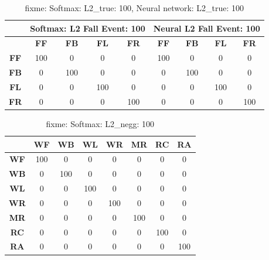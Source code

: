 \documentclass{IEEEtran}
\begin{document}
\begin{table}
\caption{fixme: Softmax: L2\_true: 100, Neural network: L2\_true: 100}
\resizebox{\columnwidth}{!}
{
\begin{tabular}{|c|c|c|c|c||c|c|c|c|}
\hline 
& \multicolumn{4}{c||}{\bf Softmax: L2 Fall Event: 100} & \multicolumn{4}{c|}{\bf Neural 
L2 Fall Event: 100} \\ \hline
& \textbf{FF} & \textbf{FB}  & \textbf{FL} & \textbf{FR} & \textbf{FF} & \textbf{FB}  & 
\textbf{FL} & \textbf{FR} \\ \hline
\textbf{FF} & 100 &  0 &  0 &  0  & 100 &  0 &  0 &  0\\ \hline
\textbf{FB} & 0 &  100 &  0 &  0  & 0 &  100 &  0 &  0\\ \hline
\textbf{FL} & 0 &  0 &  100 &  0  & 0 &  0 &  100 &  0\\ \hline
\textbf{FR} & 0 &  0 &  0 &  100  & 0 &  0 &  0 &  100 \\ \hline
\end{tabular}
}
\end{table}

\begin{table}
\caption{fixme: Softmax: L2\_negg: 100}
\resizebox{\columnwidth}{!}
{
\begin{tabular}{|c|c|c|c|c|c|c|c|}
\hline 
 & \textbf{WF} & \textbf{WB} & \textbf{WL} & \textbf{WR} & \textbf{MR} & 
\textbf{RC} & \textbf{RA} \\ \hline    
\textbf{WF} & 100 &  0 &  0 &  0 &  0 &  0 &  0 \\ \hline
\textbf{WB} & 0 &  100 &  0 &  0 &  0 &  0 &  0 \\ \hline
\textbf{WL} & 0 &  0 &  100 &  0 &  0 &  0 &  0 \\ \hline
\textbf{WR} & 0 &  0 &  0 &  100 &  0 &  0 &  0 \\ \hline
\textbf{MR} & 0 &  0 &  0 &  0 &  100 &  0 &  0 \\ \hline
\textbf{RC} & 0 &  0 &  0 &  0 &  0 &  100 &  0 \\ \hline
\textbf{RA} & 0 &  0 &  0 &  0 &  0 &  0 &  100 \\ \hline
\end{tabular}
}
\end{table}
\end{document}
